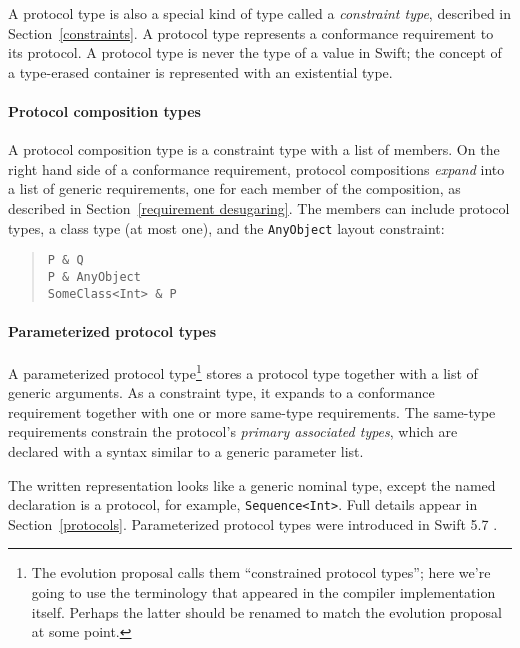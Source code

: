 \documentclass[a4paper,headsepline,bibliography=totoc,toc=flat,fleqn,twoside=semi]{scrbook}
\theoremstyle{definition}
\theoremstyle{definition}
\theoremstyle{definition}
\begin{document}
A protocol type is also a special kind of type called a \emph{constraint type}, described in Section~\ref{constraints}. A protocol type represents a conformance requirement to its protocol. A protocol type is never the type of a value in Swift; the concept of a type-erased container is represented with an existential type.

\paragraph{Protocol composition types}
A protocol composition type is a constraint type with a list of members. On the right hand side of a conformance requirement, protocol compositions \emph{expand} into a list of generic requirements, one for each member of the composition, as described in Section~\ref{requirement desugaring}. The members can include protocol types, a class type (at most one), and the \texttt{AnyObject} layout constraint:
\begin{quote}
\begin{verbatim}
P & Q
P & AnyObject
SomeClass<Int> & P
\end{verbatim}
\end{quote}

\paragraph{Parameterized protocol types}
A parameterized protocol type\footnote{The evolution proposal calls them ``constrained protocol types''; here we're going to use the terminology that appeared in the compiler implementation itself. Perhaps the latter should be renamed to match the evolution proposal at some point.} stores a protocol type together with a list of generic arguments. As a constraint type, it expands to a conformance requirement together with one or more same-type requirements. The same-type requirements constrain the protocol's \emph{primary associated types}, which are declared with a syntax similar to a generic parameter list.

The written representation looks like a generic nominal type, except the named declaration is a protocol, for example, \texttt{Sequence<Int>}. Full details appear in Section~\ref{protocols}. Parameterized protocol types were introduced in Swift 5.7 \cite{se0346}.

\end{document}

